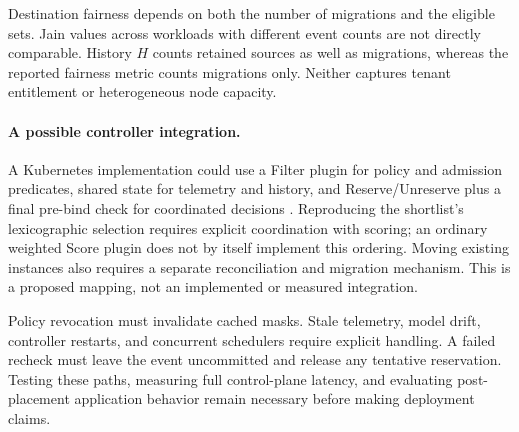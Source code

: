 Destination fairness depends on both the number of migrations and the
eligible sets. Jain values across workloads with different event counts
are not directly comparable. History $H$ counts retained sources as well
as migrations, whereas the reported fairness metric counts migrations
only. Neither captures tenant entitlement or heterogeneous node capacity.

\paragraph{A possible controller integration.}
A Kubernetes implementation could use a Filter plugin for policy and
admission predicates, shared state for telemetry and history, and
Reserve/Unreserve plus a final pre-bind check for coordinated decisions
\citep{kubernetes2026}. Reproducing the shortlist's lexicographic selection
requires explicit coordination with scoring; an ordinary weighted Score
plugin does not by itself implement this ordering. Moving existing
instances also requires a separate reconciliation and migration mechanism.
This is a proposed mapping, not an implemented or measured integration.

Policy revocation must invalidate cached masks. Stale telemetry, model
drift, controller restarts, and concurrent schedulers require explicit
handling. A failed recheck must leave the event uncommitted and release
any tentative reservation. Testing these paths, measuring full control-plane
latency, and evaluating post-placement application behavior remain necessary
before making deployment claims.

